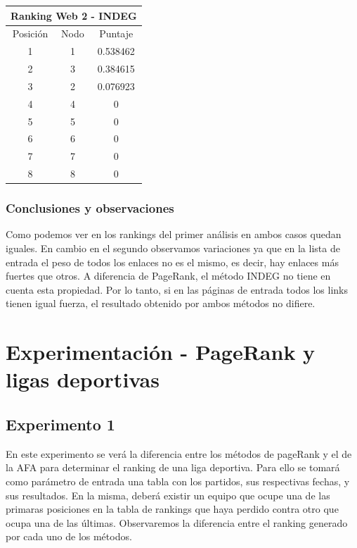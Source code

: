 \begin{center}
      			\begin{tabular}{c|c|c}
		      		\hline
		  				\multicolumn{3}{c}{Ranking Web 2 - INDEG} \\
		 			\hline
        			Posición & Nodo & Puntaje \\ \hline
         			1 & 1 & 0.538462 \\
        			2 & 3 & 0.384615 \\
        			3 & 2 & 0.076923 \\
        			4 & 4 & 0 \\
        			5 & 5 & 0 \\
        			6 & 6 & 0 \\
        			7 & 7 & 0 \\
        			8 & 8 & 0 \\
      			\end{tabular}
    	\end{center}

		\subsubsection*{Conclusiones y observaciones} 
		Como podemos ver en los rankings del primer análisis en ambos casos quedan iguales. En cambio en el segundo observamos variaciones ya que en la lista de entrada el peso de todos los enlaces no es el mismo, es decir, hay enlaces más fuertes que otros. A diferencia de PageRank, el método INDEG no tiene en cuenta esta propiedad. Por lo tanto, si en las páginas de entrada todos los links tienen igual fuerza, el resultado obtenido por ambos métodos no difiere. 


\section{Experimentación - PageRank y ligas deportivas}
	
	\subsection{Experimento 1}
	En este experimento se verá la diferencia entre los métodos de pageRank y el de la AFA para determinar el ranking de una liga deportiva. Para ello se tomará como parámetro de entrada una tabla con los partidos, sus respectivas fechas, y sus resultados. En la misma, deberá existir un equipo que ocupe una de las primaras posiciones en la tabla de rankings que haya perdido contra otro que ocupa una de las últimas. Observaremos la diferencia entre el ranking generado por cada uno de los métodos.
		

